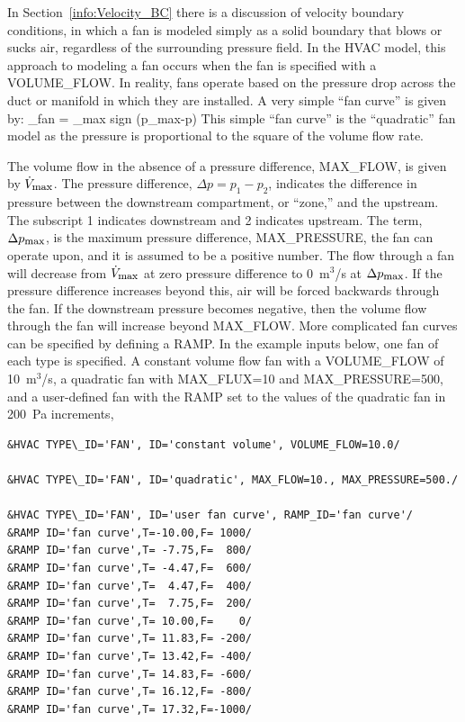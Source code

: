 \documentclass[11pt]{book}
\begin{document}
In Section~\ref{info:Velocity_BC} there is a discussion of velocity boundary conditions,
in which a fan is modeled simply as a solid boundary that blows or
sucks air, regardless of the surrounding pressure field. In the HVAC model, this approach to modeling a fan occurs when the fan is specified with a {\ct VOLUME\_FLOW}.
In reality, fans operate based on
the pressure drop across the duct or manifold in which they are
installed. A very simple ``fan curve'' is given by:
\be {}_{\hbox{\footnotesize fan}} = _{\hbox{\footnotesize max}} \;
   \hbox{sign} (\Delta p_{\hbox{\footnotesize max}}-\Delta p)
     \label{fan_curve} \ee
This simple ``fan curve'' is the ``quadratic'' fan model as the pressure is proportional to the square of the volume flow rate.

The volume flow in the absence of a pressure difference, {\ct MAX\_FLOW}, is given by $\dot{V}_{\hbox{\footnotesize max}}$.  The pressure difference, $\Delta p=p_1-p_2$, indicates the difference in
pressure between the downstream compartment, or ``zone,'' and the upstream. The subscript 1 indicates downstream and 2 indicates upstream.
The term, $\Delta p_{\hbox{\footnotesize max}}$, is the maximum
pressure difference, {\ct MAX\_PRESSURE}, the fan can operate upon, and it is assumed to be a positive number.
The flow through a fan will decrease from $\dot{V}_{\hbox{\footnotesize max}}$ at zero pressure difference to 0~m$^3$/s at $\Delta p_{\hbox{\footnotesize max}}$.
If the pressure difference increases beyond this, air will be forced backwards through the fan.   If the downstream pressure becomes negative, then the volume flow through the fan will increase beyond {\ct MAX\_FLOW}. More complicated fan curves can be specified by defining a {\ct RAMP}.  In the example inputs below, one fan of each type is specified.  A constant volume flow fan with a {\ct VOLUME\_FLOW} of 10~m$^3$/s, a quadratic fan with {\ct MAX\_FLUX=10} and {\ct MAX\_PRESSURE=500}, and a user-defined fan with the {\ct RAMP} set to the values of the quadratic fan in 200~Pa increments,

\begin{lstlisting}
&HVAC TYPE\_ID='FAN', ID='constant volume', VOLUME_FLOW=10.0/

&HVAC TYPE\_ID='FAN', ID='quadratic', MAX_FLOW=10., MAX_PRESSURE=500./

&HVAC TYPE\_ID='FAN', ID='user fan curve', RAMP_ID='fan curve'/
&RAMP ID='fan curve',T=-10.00,F= 1000/
&RAMP ID='fan curve',T= -7.75,F=  800/
&RAMP ID='fan curve',T= -4.47,F=  600/
&RAMP ID='fan curve',T=  4.47,F=  400/
&RAMP ID='fan curve',T=  7.75,F=  200/
&RAMP ID='fan curve',T= 10.00,F=    0/
&RAMP ID='fan curve',T= 11.83,F= -200/
&RAMP ID='fan curve',T= 13.42,F= -400/
&RAMP ID='fan curve',T= 14.83,F= -600/
&RAMP ID='fan curve',T= 16.12,F= -800/
&RAMP ID='fan curve',T= 17.32,F=-1000/
\end{lstlisting}
\end{document}

